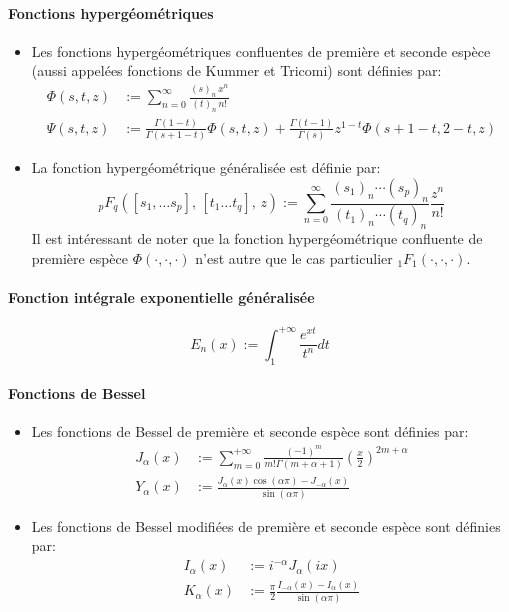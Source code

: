 \paragraph{Fonctions hypergéométriques}
\begin{itemize}
    \item Les fonctions hypergéométriques confluentes de première et seconde espèce (aussi appelées fonctions de Kummer et Tricomi) sont définies par:
    \[
        \begin{aligned}
            \Phi(s, t, z) &:= \sum_{n=0}^{\infty} \frac{{(s)}_n \, x^n}{{(t)}_n \, n!}  \\
            \Psi(s,t,z) &:= \frac{\Gamma(1-t)}{\Gamma(s+1-t)}\Phi(s,t,z)+\frac{\Gamma(t-1)}{\Gamma(s)}z^{1-t}\Phi(s+1-t,2-t,z)
        \end{aligned}
    \] 
    \item La fonction hypergéométrique généralisée est définie par:
    \[
    _p F_q\left([s_1,\dots s_p],\,[t_1\dots t_q],\,z\right):=\sum_{n=0}^\infty\frac{{(s_1)}_n\cdots{(s_p)}_n}{{(t_1)}_n\cdots {(t_q)}_n}\frac{z^n}{n!}
    \]
    Il est intéressant de noter que la fonction hypergéométrique confluente de première espèce $\Phi(\cdot,\cdot,\cdot)$ n'est autre que le cas particulier $_1F_1(\cdot,\cdot,\cdot)$.
\end{itemize}

\paragraph{Fonction intégrale exponentielle généralisée}
\[
E_n(x):=\int_1^{+\infty}\frac{e^{xt}}{t^n}dt
\]

\paragraph{Fonctions de Bessel}
\begin{itemize}
    \item Les fonctions de Bessel de première et seconde espèce sont définies par:
    \[
    \begin{aligned}
        J_\alpha(x)&:=\sum_{m=0}^{+\infty}\frac{(-1)^m}{m!\Gamma(m+\alpha+1)}{\left(\frac{x}{2}\right)}^{2m+\alpha} \\
        Y_\alpha(x)&:=\frac{J_\alpha(x)\cos(\alpha\pi)-J_{-\alpha}(x)}{\sin(\alpha\pi)}
    \end{aligned}
    \]
    \item Les fonctions de Bessel modifiées de première et seconde espèce sont définies par:
    \[
    \begin{aligned}
        I_\alpha(x)&:=i^{-\alpha}J_\alpha(ix)\\
        K_\alpha(x)&:=\frac{\pi}{2}\frac{I_{-\alpha}(x)-I_\alpha(x)}{\sin(\alpha\pi)}
    \end{aligned}
    \]
\end{itemize}

